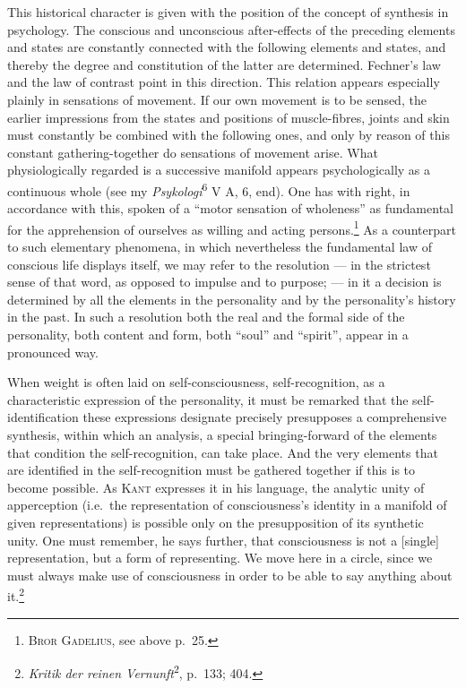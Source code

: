 \documentclass[12pt]{book}
\newcommand{\opage}[1]{\marginnote{\footnotesize\textit{[#1]}}}
\begin{document}
This historical character is given with the position of the concept of synthesis in
psychology. The conscious and unconscious after-effects of the preceding elements and
states are constantly connected with the following elements and states, and thereby
the degree and constitution of the latter are determined. Fechner's law and the law of
contrast point in this direction. This relation appears especially plainly in
sensations of movement. If our own movement is to be sensed, the earlier impressions
from the states and positions of muscle-fibres, joints and skin must constantly be
combined with the following ones, and only by reason of this constant
gathering-together do sensations of movement arise. What physiologically regarded is a
successive manifold appears psychologically as a continuous whole (see my
\textit{Psykologi}\textsuperscript{6} V A, 6, end). One has with right, in accordance
with this, spoken of a ``motor sensation of wholeness'' as fundamental for the
apprehension of ourselves as willing and acting persons.\footnote{\textsc{Bror
Gadelius}, see above p.\ 25.} As a counterpart to
such elementary phenomena, in which nevertheless the fundamental law of conscious life
displays itself, we may refer to the resolution --- in the strictest sense of that
word, as opposed to impulse and to purpose; --- in it a decision is determined by all
the elements in the personality and by the personality's history in the past. In such
a resolution both the real and the formal side of the personality, both content and
form, both ``soul'' and ``spirit'', appear in a pronounced way.

When weight is often laid on self-consciousness, self-recognition, as a characteristic
expression of the personality, it must be remarked that the self-identification these
expressions designate precisely presupposes a comprehensive synthesis, within which an
\opage{58}analysis, a special bringing-forward of the elements that condition the
self-recognition, can take place. And the very elements that are identified in the
self-recognition must be gathered together if this is to become possible. As
\textsc{Kant} expresses it in his language, the analytic unity of apperception (i.e.\
the representation of consciousness's identity in a manifold of given representations)
is possible only on the presupposition of its synthetic unity. One must remember, he
says further, that consciousness is not a [single] representation, but a form of
representing. We move here in a circle, since we must always make use of consciousness
in order to be able to say anything about it.\footnote{\textit{Kritik der reinen
Vernunft}\textsuperscript{2}, p.\ 133; 404.}
\end{document}
